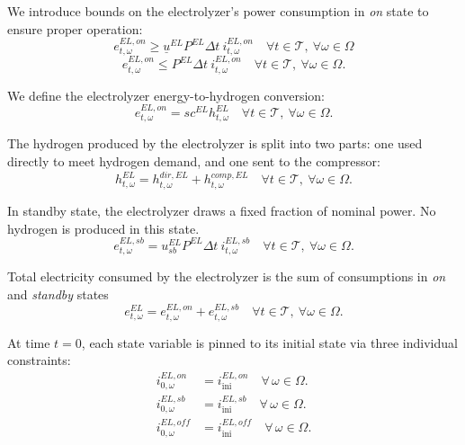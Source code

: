 \documentclass{article}
\begin{document}
We introduce bounds on the electrolyzer's power consumption in \emph{on} state to ensure proper operation:
\begin{equation} \label{EQ:EL_min_power}
    e^{EL,on}_{t, \omega} \geq \underline{u}^{EL}  P^{EL} \Delta t \ i^{EL,on}_{t, \omega} \quad \forall t \in \mathcal{T}, \ \forall \omega \in \Omega
\end{equation}
\begin{equation} \label{EQ:EL_max_power}
    e^{EL,on}_{t, \omega} \leq P^{EL} \Delta t \ i^{EL,on}_{t, \omega} \quad \forall t \in \mathcal{T}, \ \forall \omega \in \Omega.
\end{equation}

\medskip

We define the electrolyzer energy-to-hydrogen conversion:
\begin{equation} \label{EQ:EL_conversion}
    e^{EL,on}_{t, \omega} = sc^{EL}  h^{EL}_{t, \omega} \quad \forall t \in \mathcal{T}, \ \forall \omega \in \Omega.
\end{equation}

The hydrogen produced by the electrolyzer is split into two parts: one used directly to meet hydrogen demand, and one sent to the compressor:
\begin{equation} \label{EQ:EL_split}
    h^{EL}_{t, \omega} = h^{dir,EL}_{t, \omega} + h^{comp,EL}_{t, \omega} \quad \forall t \in \mathcal{T}, \ \forall \omega \in \Omega.
\end{equation}

\medskip

In standby state, the electrolyzer draws a fixed fraction of nominal power.
No hydrogen is produced in this state.
\begin{equation} \label{EQ:EL_SB_energy_balance}
    e^{EL,sb}_{t,\omega} = u_{sb}^{EL}  P^{EL} \Delta t \ i^{EL,sb}_{t,\omega} \quad \forall t \in \mathcal{T}, \ \forall \omega \in \Omega.
\end{equation}

Total electricity consumed by the electrolyzer is the sum of consumptions in \emph{on} and \emph{standby} states
\begin{equation} \label{EQ:EL_energy_balance}
    e^{EL}_{t,\omega} = e^{EL,on}_{t,\omega} + e^{EL,sb}_{t,\omega} \quad \forall t \in \mathcal{T}, \ \forall \omega \in \Omega.
\end{equation}


At time \(t=0\), each state variable is pinned to its initial state via three individual constraints:
\begin{align}
  \label{EQ:EL_on_ini}
  i^{EL,on}_{0,\omega}
  &= i^{EL,on}_{\mathrm{ini}}
  \quad \forall\,\omega\in\Omega.\\
  \label{EQ:EL_sb_ini}
  i^{EL,sb}_{0,\omega}
  &= i^{EL,sb}_{\mathrm{ini}}
  \quad \forall\,\omega\in\Omega.\\
  \label{EQ:EL_off_ini}
  i^{EL,off}_{0,\omega}
  &= i^{EL,off}_{\mathrm{ini}}
  \quad \forall\,\omega\in\Omega.
\end{align}
\end{document}
